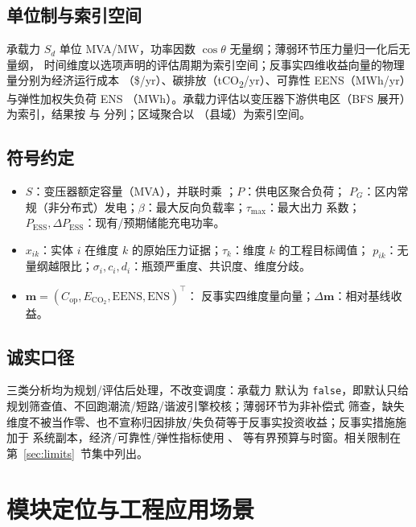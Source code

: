 \documentclass[UTF8,fontset=fandol,a4paper,11pt]{ctexart}
\begin{document}
\subsection{单位制与索引空间}
承载力 $S_d$ 单位 MVA/MW，功率因数 $\cos\theta$ 无量纲；薄弱环节压力量归一化后无量纲，
时间维度以选项声明的评估周期为索引空间；反事实四维收益向量的物理量分别为经济运行成本
（\$/yr）、碳排放（tCO\textsubscript{2}/yr）、可靠性 EENS（MWh/yr）与弹性加权失负荷 ENS
（MWh）。承载力评估以变压器下游供电区（BFS 展开）为索引，结果按  与
 分列；区域聚合以 （县域）为索引空间。

\subsection{符号约定}
\begin{itemize}
  \item $S$：变压器额定容量（MVA），并联时乘 ；$P$：供电区聚合负荷；
        $P_G$：区内常规（非分布式）发电；$\beta$：最大反向负载率；$\tau_{\max}$：最大出力
        系数；$P_{\text{ESS}},\Delta P_{\text{ESS}}$：现有/预期储能充电功率。
  \item $x_{ik}$：实体 $i$ 在维度 $k$ 的原始压力证据；$\tau_k$：维度 $k$ 的工程目标阈值；
        $p_{ik}$：无量纲越限比；$\sigma_i,c_i,d_i$：瓶颈严重度、共识度、维度分歧。
  \item $\mathbf{m}=(C_{\text{op}},E_{\mathrm{CO_2}},\text{EENS},\text{ENS})^\top$：
        反事实四维度量向量；$\Delta\mathbf{m}$：相对基线收益。
\end{itemize}

\subsection{诚实口径}
三类分析均为规划/评估后处理，不改变调度：承载力  默认为
\texttt{false}，即默认只给规划筛查值、不回跑潮流/短路/谐波引擎校核；薄弱环节为非补偿式
筛查，缺失维度不被当作零、也不宣称归因排放/失负荷等于反事实投资收益；反事实措施施加于
系统副本，经济/可靠性/弹性指标使用 、
 等有界预算与时窗。相关限制在第~\ref{sec:limits}~节集中列出。

\section{模块定位与工程应用场景}\label{sec:scope}
\end{document}
